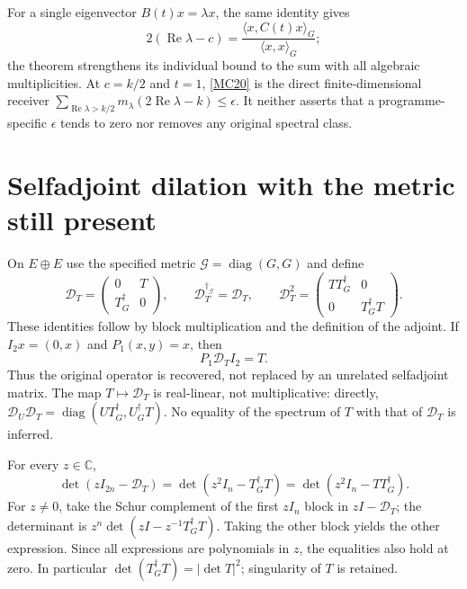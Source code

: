 \documentclass[11pt]{article}
\newcommand{\Rea}{\operatorname{Re}}
\newcommand{\adj}{\dagger_G}
\begin{document}
For a single eigenvector \(B(t)x=\lambda x\), the same identity gives
\[
 2(\Rea\lambda-c)=
 \frac{\langle x,C(t)x\rangle_G}{\langle x,x\rangle_G};
\]
the theorem strengthens its individual bound to the sum with all
algebraic multiplicities. At \(c=k/2\) and \(t=1\),
\eqref{MC20} is the direct finite-dimensional receiver
\(\sum_{\Rea\lambda>k/2}m_\lambda(2\Rea\lambda-k)\le\epsilon\).
It neither asserts that a programme-specific \(\epsilon\) tends to zero
nor removes any original spectral class.

\section{Selfadjoint dilation with the metric still present}

On \(E\oplus E\) use the specified metric
\(\mathcal G=\operatorname{diag}(G,G)\) and define
\begin{equation}
 \mathcal D_T=
 \begin{pmatrix}0&T\\T^\adj&0\end{pmatrix},
 \qquad
 \mathcal D_T^{\dagger_{\mathcal G}}=\mathcal D_T,\qquad
 \mathcal D_T^2=
 \begin{pmatrix}TT^\adj&0\\0&T^\adj T\end{pmatrix}.
 \tag{MC21}\label{MC21}
\end{equation}
These identities follow by block multiplication and the definition of
the adjoint. If \(I_2x=(0,x)\) and \(P_1(x,y)=x\), then
\begin{equation}
 P_1\mathcal D_T I_2=T.
 \tag{MC22}\label{MC22}
\end{equation}
Thus the original operator is recovered, not replaced by an unrelated
selfadjoint matrix. The map \(T\mapsto\mathcal D_T\) is real-linear,
not multiplicative: directly,
\(\mathcal D_U\mathcal D_T=\operatorname{diag}(UT^\adj,U^\adj T)\).
No equality of the spectrum of \(T\) with that of \(\mathcal D_T\)
is inferred.

For every \(z\in\mathbb C\),
\begin{equation}
 \det(zI_{2n}-\mathcal D_T)
  =\det(z^2I_n-T^\adj T)
  =\det(z^2I_n-TT^\adj).
 \tag{MC23}\label{MC23}
\end{equation}
For \(z\ne0\), take the Schur complement of the first \(zI_n\)
block in \(zI-\mathcal D_T\); the determinant is
\(z^n\det(zI-z^{-1}T^\adj T)\). Taking the other block yields
the other expression. Since all expressions are polynomials in \(z\),
the equalities also hold at zero. In particular
\(\det(T^\adj T)=|\det T|^2\); singularity of \(T\) is retained.
\end{document}
